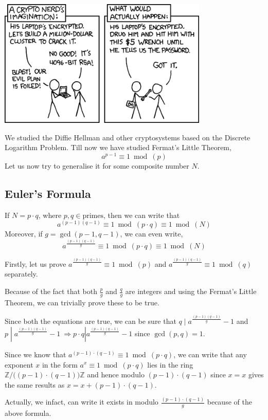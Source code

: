 \begin{center}
	\includegraphics[width=0.75\textwidth]{Photos/RSA.png}
\end{center}

		We studied the Diffie Hellman and other cryptosystems based on the Discrete Logarithm Problem. Till now we have studied Fermat's Little Theorem, \[a^{p-1}\equiv 1 \bmod(p)\]
		Let us now try to generalise it for some composite number \(N\).
		
		\subsection{Euler's Formula}\label{subsec:EuclidFormula}
			If \(N = p \cdot q\), where \(p, q \in \text{primes}\), then we can write that \[a^{(p-1)(q-1)} \equiv 1 \bmod(p\cdot q) \equiv 1\bmod(N)\]Moreover, if \(g = \gcd(p-1,q-1)\), we can even write, \[a^\frac{(p-1)(q-1)}g \equiv 1 \bmod(p\cdot q) \equiv 1\bmod(N)\]
			\begin{tcolorbox}[title=Proof]
					Firstly, let us prove \(a^\frac{(p-1)(q-1)}g \equiv 1 \bmod(p)\) and \(a^\frac{(p-1)(q-1)}g \equiv 1 \bmod(q)\) separately. \par
					Because of the fact that both \(\frac pg\) and \(\frac qg\) are integers and using the Fermat's Little Theorem, we can trivially prove these to be true.\par
					Since both the equations are true, we can be sure that \(q\; |\;a^\frac{(p-1)(q-1)}g -1\) and \(p\; |\; a^\frac{(p-1)(q-1)}g-1\: \Rightarrow p\cdot q | a^\frac{(p-1)(q-1)}g-1\) since \(\gcd(p,q)=1\).
			\end{tcolorbox}

			Since we know that \(a^{(p-1)\cdot(q-1)}\equiv 1 \bmod(p\cdot q)\), we can write that any exponent \(x\) in the form \(a^x \equiv 1 \bmod(p\cdot q)\) lies in the ring \(\mathbb{Z}/\big((p-1)\cdot (q-1)\big)\mathbb{Z}\) and hence modulo \((p-1) \cdot (q-1)\) since $x=x$ gives the same results as $x=x+(p-1)\cdot (q-1)$.\par
			Actually, we infact, can write it exists in modulo \(\frac{(p-1)\cdot(q-1)}g\) because of the above formula.

